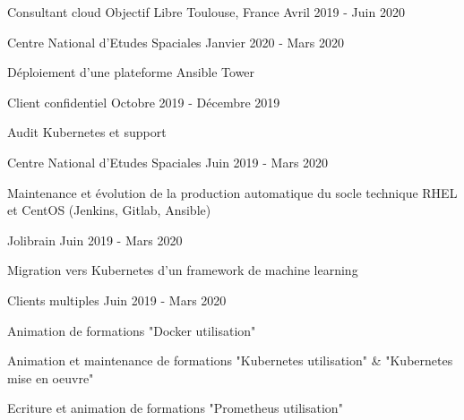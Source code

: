 \begin{cventries}
  \cventry
    {Consultant cloud} %
    {Objectif Libre} %
    {Toulouse, France} %
    {Avril 2019 - Juin 2020} %
    {
      \begin{cvsubentries}
        \cvsubentry
          {}
          {Centre National d'Etudes Spaciales}
          {Janvier 2020 - Mars 2020}
          {
            \begin{cvitems} %
              \item {Déploiement d'une plateforme Ansible Tower}
            \end{cvitems}
          }
        \cvsubentry
          {}
          {Client confidentiel}
          {Octobre 2019 - Décembre 2019}
          {
            \begin{cvitems} %
              \item {Audit Kubernetes et support}
            \end{cvitems}
          }
        \cvsubentry
          {}
          {Centre National d'Etudes Spaciales}
          {Juin 2019 - Mars 2020}
          {
            \begin{cvitems} %
              \item {Maintenance et évolution de la production automatique du socle technique RHEL et CentOS (Jenkins, Gitlab, Ansible)}
            \end{cvitems}
          }
        \cvsubentry
          {}
          {Jolibrain}
          {Juin 2019 - Mars 2020}
          {
            \begin{cvitems} %
              \item {Migration vers Kubernetes d'un framework de machine learning}
            \end{cvitems}
          }
        \cvsubentry
          {}
          {Clients multiples}
          {Juin 2019 - Mars 2020}
          {
            \begin{cvitems} %
              \item {Animation de formations "Docker utilisation"}
              \item {Animation et maintenance de formations "Kubernetes utilisation" \& "Kubernetes mise en oeuvre"}
              \item {Ecriture et animation de formations "Prometheus utilisation"}
            \end{cvitems}
          }
      \end{cvsubentries}
    }


\end{cventries}

